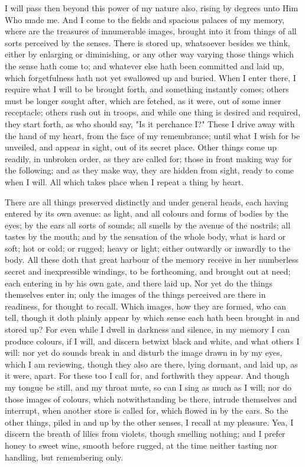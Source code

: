\documentclass[b5paper,openright,12pt,twoside]{book}
\begin{document}
I will pass then beyond this power of my nature also, rising by degrees
unto Him Who made me. And I come to the fields and spacious palaces of
my memory, where are the treasures of innumerable images, brought into
it from things of all sorts perceived by the senses. There is stored up,
whatsoever besides we think, either by enlarging or diminishing, or
any other way varying those things which the sense hath come to; and
whatever else hath been committed and laid up, which forgetfulness hath
not yet swallowed up and buried. When I enter there, I require what I
will to be brought forth, and something instantly comes; others must be
longer sought after, which are fetched, as it were, out of some inner
receptacle; others rush out in troops, and while one thing is desired
and required, they start forth, as who should say, "Is it perchance
I?" These I drive away with the hand of my heart, from the face of my
remembrance; until what I wish for be unveiled, and appear in sight, out
of its secret place. Other things come up readily, in unbroken order, as
they are called for; those in front making way for the following; and
as they make way, they are hidden from sight, ready to come when I will.
All which takes place when I repeat a thing by heart.

There are all things preserved distinctly and under general heads, each
having entered by its own avenue: as light, and all colours and forms of
bodies by the eyes; by the ears all sorts of sounds; all smells by the
avenue of the nostrils; all tastes by the mouth; and by the sensation of
the whole body, what is hard or soft; hot or cold; or rugged; heavy or
light; either outwardly or inwardly to the body. All these doth that
great harbour of the memory receive in her numberless secret and
inexpressible windings, to be forthcoming, and brought out at need; each
entering in by his own gate, and there laid up. Nor yet do the things
themselves enter in; only the images of the things perceived are there
in readiness, for thought to recall. Which images, how they are formed,
who can tell, though it doth plainly appear by which sense each hath
been brought in and stored up? For even while I dwell in darkness and
silence, in my memory I can produce colours, if I will, and discern
betwixt black and white, and what others I will: nor yet do sounds break
in and disturb the image drawn in by my eyes, which I am reviewing,
though they also are there, lying dormant, and laid up, as it were,
apart. For these too I call for, and forthwith they appear. And though
my tongue be still, and my throat mute, so can I sing as much as I will;
nor do those images of colours, which notwithstanding be there, intrude
themselves and interrupt, when another store is called for, which
flowed in by the ears. So the other things, piled in and up by the other
senses, I recall at my pleasure. Yea, I discern the breath of lilies
from violets, though smelling nothing; and I prefer honey to sweet wine,
smooth before rugged, at the time neither tasting nor handling, but
remembering only.
\end{document}
